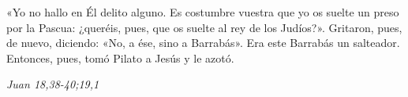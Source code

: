 \documentclass[../../devocionario.tex]{subfiles}
\begin{document}
    «Yo no hallo en Él delito alguno. Es costumbre vuestra que yo os suelte un preso por la Pascua: 
    ¿queréis, pues, que os suelte al rey de los Judíos?». Gritaron, pues, de nuevo, diciendo: «No, a ése, sino a Barrabás». 
    Era este Barrabás un salteador. Entonces, pues, tomó Pilato a Jesús y le azotó.

    \begin{flushright}
        \emph{Juan 18,38-40;19,1}
    \end{flushright}
\end{document}
